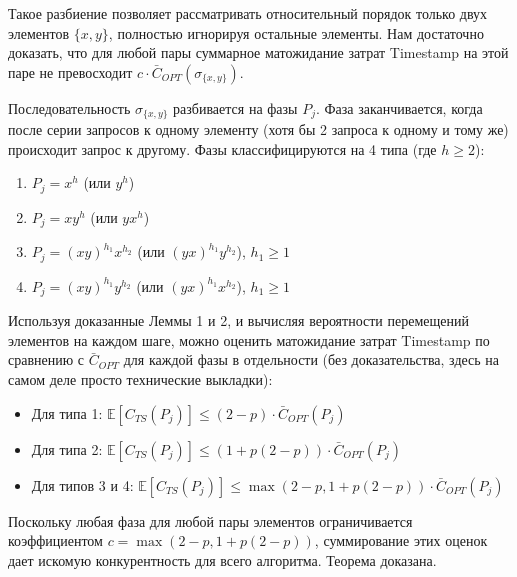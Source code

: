 \documentclass[12pt, a4paper]{article}
\begin{document}
Такое разбиение позволяет рассматривать относительный порядок только двух элементов $\{x, y\}$, полностью игнорируя остальные элементы. Нам достаточно доказать, что для любой пары суммарное матожидание затрат Timestamp на этой паре не превосходит $c \cdot \bar{C}_{OPT}(\sigma_{\{x,y\}})$.

Последовательность $\sigma_{\{x,y\}}$ разбивается на фазы $P_j$. Фаза заканчивается, когда после серии запросов к одному элементу (хотя бы 2 запроса к одному и тому же) происходит запрос к другому. Фазы классифицируются на 4 типа (где $h \ge 2$):
\begin{enumerate}
    \item $P_j = x^h$ (или $y^h$)
    \item $P_j = x y^h$ (или $y x^h$)
    \item $P_j = (xy)^{h_1} x^{h_2}$ (или $(yx)^{h_1} y^{h_2}$), $h_1 \ge 1$
    \item $P_j = (xy)^{h_1} y^{h_2}$ (или $(yx)^{h_1} x^{h_2}$), $h_1 \ge 1$
\end{enumerate}

Используя доказанные Леммы 1 и 2, и вычисляя вероятности перемещений элементов на каждом шаге, можно оценить матожидание затрат Timestamp по сравнению с $\bar{C}_{OPT}$ для каждой фазы в отдельности (без доказательства, здесь на самом деле просто технические выкладки):
\begin{itemize}
    \item Для типа 1: $\mathbb{E}[C_{TS}(P_j)] \le (2 - p) \cdot \bar{C}_{OPT}(P_j)$
    \item Для типа 2: $\mathbb{E}[C_{TS}(P_j)] \le (1 + p(2 - p)) \cdot \bar{C}_{OPT}(P_j)$
    \item Для типов 3 и 4: $\mathbb{E}[C_{TS}(P_j)] \le \max(2 - p, 1 + p(2 - p)) \cdot \bar{C}_{OPT}(P_j)$
\end{itemize}

Поскольку любая фаза для любой пары элементов ограничивается коэффициентом $c = \max(2 - p, 1 + p(2 - p))$, суммирование этих оценок дает искомую конкурентность для всего алгоритма. Теорема доказана.
\end{document}

